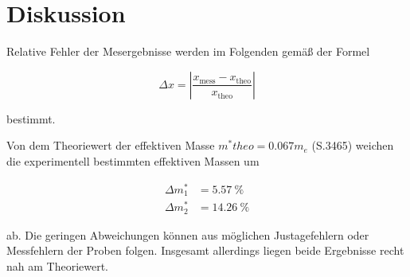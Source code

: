 \section{Diskussion}
\label{sec:Diskussion}

Relative Fehler der Mesergebnisse werden im Folgenden gemäß der Formel

\begin{equation}
    \Delta x = \left| \frac{x_\text{mess} - x_\text{theo}}{x_\text{theo}}\right|
\end{equation}

bestimmt. 

Von dem Theoriewert der effektiven Masse $m^*{theo} = \num{0.067}m_e$ \cite{Theo} (S.3465)
weichen die experimentell bestimmten effektiven Massen um

\begin{align*}
    \Delta m^*_1 &= \SI{5.57}{\percent} \\
    \Delta m^*_2 &= \SI{14.26}{\percent}
\end{align*}

ab.
Die geringen Abweichungen können aus möglichen Justagefehlern oder
Messfehlern der Proben folgen.
Insgesamt allerdings liegen beide Ergebnisse recht nah am Theoriewert.
